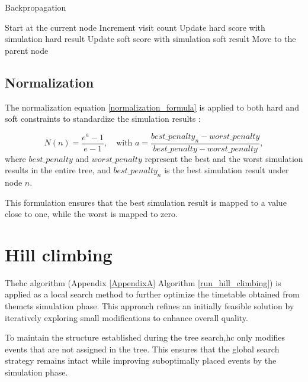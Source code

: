 \begin{algorithm}
\caption{Backpropagation}\label{backpropagation}
\begin{algorithmic}[1]
    \State Start at the current node
        \State Increment visit count
        \State Update hard score with simulation hard result
        \State Update soft score with simulation soft result
        \State Move to the parent node
    \EndWhile
\EndProcedure
\end{algorithmic}
\end{algorithm}

\subsection{Normalization}\label{sec:normalization}

The normalization equation \ref{normalization_formula} is applied to both hard and soft constraints to standardize the simulation results \cite{pedroso_tree_2015}:

\begin{equation}
N(n) = \frac{e^a - 1}{e - 1}, \quad \text{with } a = \frac{best\_penalty_n - worst\_penalty}{best\_penalty - worst\_penalty},\label{normalization_formula}
\end{equation}
where \(best\_penalty\) and \(worst\_penalty\) represent the best and the worst simulation results in the entire tree, and \(best\_penalty_n\) is the best simulation result under node \(n\).

This formulation ensures that the best simulation result is mapped to a value close to one, while the worst is mapped to zero.

\section{Hill climbing}\label{hill_climbing_section}

The\ac{hc} algorithm (Appendix \ref{AppendixA} Algorithm \ref{run_hill_climbing}) is applied as a local search method to further optimize the timetable obtained from the\ac{mcts} simulation phase. This approach refines an initially feasible solution by iteratively exploring small modifications to enhance overall quality.

To maintain the structure established during the tree search,\ac{hc} only modifies events that are not assigned in the tree. This ensures that the global search strategy remains intact while improving suboptimally placed events by the simulation phase.

